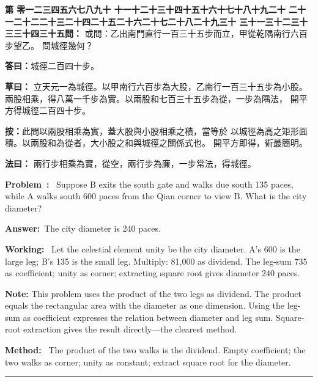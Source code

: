 \documentclass[9pt,a4paper]{article}
\newcounter{probnum}
\newcounter{overallnum}
\newcommand{\chnum}[1]{%
  \ifcase#1 零\or 一\or 二\or 三\or 四\or 五\or 六\or 七\or 八\or 九\or 十\or
    十一\or 十二\or 十三\or 十四\or 十五\or 十六\or 十七\or 十八\or 十九\or 二十\or
    二十一\or 二十二\or 二十三\or 二十四\or 二十五\or 二十六\or 二十七\or 二十八\or 二十九\or 三十\or
    三十一\or 三十二\or 三十三\or 三十四\or 三十五\fi}
\newcommand{\problem}[1]{\stepcounter{probnum}\stepcounter{overallnum}\par\noindent\textbf{\color{volcolor}第\chnum{\value{probnum}}問：}#1\par\vspace{0.15cm}}
\newcommand{\answer}[1]{\par\noindent\textbf{答曰：}#1\par\vspace{0.15cm}}
\newcommand{\working}[1]{\par\noindent\textbf{草曰：}#1\par\vspace{0.15cm}}
\newcommand{\method}[1]{\par\noindent\textbf{法曰：}#1\par\vspace{0.25cm}}
\newcommand{\eproblem}[1]{\par\noindent\textbf{\color{volcolor}Problem~\theoverallnum:}~#1\par\vspace{0.15cm}}
\newcommand{\eanswer}[1]{\par\noindent\textbf{Answer:}~#1\par\vspace{0.15cm}}
\newcommand{\eworking}[1]{\par\noindent\textbf{Working:}~#1\par\vspace{0.15cm}}
\newcommand{\emethod}[1]{\par\noindent\textbf{Method:}~#1\par\vspace{0.25cm}}
\begin{document}
\noindent\begin{minipage}[t]{0.48\textwidth}
\problem{
或問：乙出南門直行一百三十五步而立，甲從乾隅南行六百步望乙。
問城徑幾何？
}

\answer{城徑二百四十步。}

\working{
立天元一為城徑。以甲南行六百步為大股，乙南行一百三十五步為小股。
兩股相乘，得八萬一千步為實。以兩股和七百三十五步為從，一步為隅法，
開平方得城徑二百四十步。

\textbf{按：}此問以兩股相乘為實，蓋大股與小股相乘之積，當等於
以城徑為高之矩形面積。以兩股和為從者，大小股之和與城徑之關係式也。
開平方即得，術最簡明。
}

\method{
兩行步相乘為實，從空，兩行步為廉，一步常法，得城徑。
}
\end{minipage}%
\hfill%
\begin{minipage}[t]{0.50\textwidth}
\eproblem{
Suppose B exits the south gate and walks due south 135 paces, while A walks
south 600 paces from the Qian corner to view B. What is the city diameter?
}

\eanswer{The city diameter is 240 paces.}

\eworking{
Let the celestial element unity be the city diameter. A's 600 is the large
leg; B's 135 is the small leg. Multiply: 81,000 as dividend. The leg-sum
735 as coefficient; unity as corner; extracting square root gives diameter
240 paces.

\textbf{Note:} This problem uses the product of the two legs as dividend. The
product equals the rectangular area with the diameter as one dimension. Using
the leg-sum as coefficient expresses the relation between diameter and leg sum.
Square-root extraction gives the result directly---the clearest method.
}

\emethod{
The product of the two walks is the dividend. Empty coefficient; the two
walks as corner; unity as constant; extract square root for the diameter.
}
\end{minipage}
\vspace{0.15cm}

\vspace{0.15cm}
\noindent\rule{\textwidth}{0.2pt}
\vspace{0.15cm}
\end{document}
